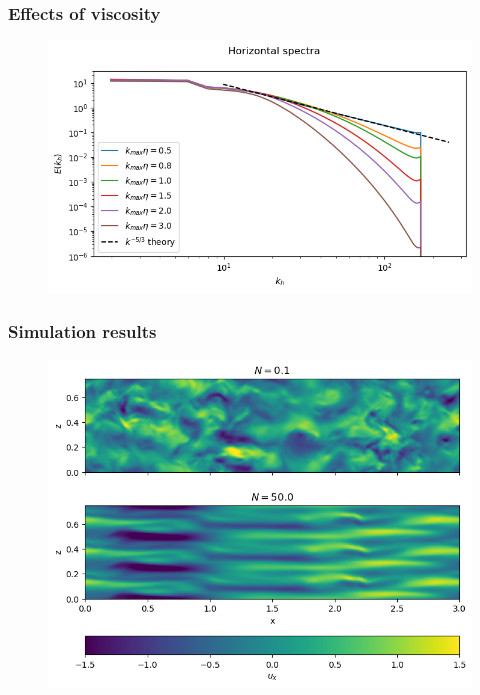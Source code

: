 \documentclass{beamer}
\begin{document}
\begin{frame}
\frametitle{Effects of viscosity}

\begin{figure}
	\centering
	\includegraphics[height=0.7\textheight]{fig/kmax_eta.png}
\end{figure}


\end{frame}


\begin{frame}
\frametitle{Simulation results}

\begin{figure}
    \centering
    \includegraphics[height=0.65\textheight]{fig/vert_slice.png}
\end{figure}

\end{frame}
\end{document}
